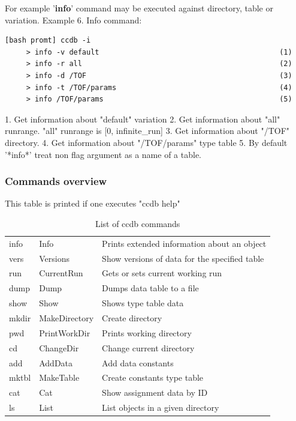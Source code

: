 \documentclass{article}
\begin{document}
For example '\textbf{info}' command may be executed against directory, table or variation.
Example 6. Info command:
\begin{verbatim}
[bash promt] ccdb -i
     > info -v default                                          (1)
     > info -r all                                              (2)
     > info -d /TOF                                             (3)
     > info -t /TOF/params                                      (4)
     > info /TOF/params                                         (5)
\end{verbatim}

1. Get information about "default" variation
2. Get information about "all" runrange. "all" runrange is [0, infinite\_run]
3. Get information about "/TOF" directory.
4. Get information about "/TOF/params" type table
5. By default '*info*' treat non flag argument as a name of a table.

\subsubsection{Commands overview}

This table is printed if one executes "ccdb help"
\begin{table}[position specifier]
\centering
\begin{tabular}{| l | l | l |}
  \hline
  info   & Info          & Prints extended information about an object \\
  vers   & Versions      & Show versions of data for the specified table \\
  run    & CurrentRun    & Gets or sets current working run \\
  dump   & Dump          & Dumps data table to a file \\
  show   & Show          & Shows type table data \\
  mkdir  & MakeDirectory & Create directory \\
  pwd    & PrintWorkDir  & Prints working directory \\
  cd     & ChangeDir     & Change current directory \\
  add    & AddData       & Add data constants \\
  mktbl  & MakeTable     & Create constants type table \\
  cat    & Cat           & Show assignment data by ID \\
  ls     & List          & List objects in a given directory \\
  \hline
\end{tabular}
\caption{List of ccdb commands}
\label{tab:commands}
\end{table}
\end{document}
